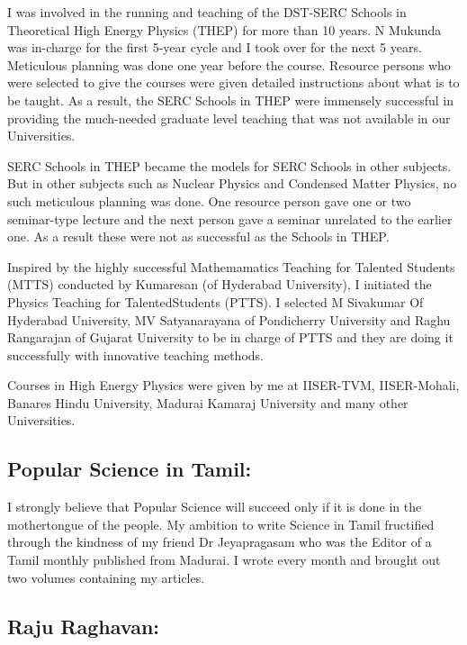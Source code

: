 I was involved in the running and teaching of the DST-SERC
Schools in Theoretical High Energy Physics (THEP) for more
than 10 years. N Mukunda was in-charge for the first 5-year
cycle and I took over for the next 5 years. Meticulous planning
was done one year before the course. Resource persons who were
selected to give the courses were given detailed instructions
about what is to be taught. As a result, the SERC Schools in
THEP were immensely successful in providing the much-needed
graduate level teaching that was not available in our Universities.


SERC Schools in THEP became the models for SERC Schools in other
subjects. But in other subjects such as Nuclear Physics and
Condensed Matter Physics, no such meticulous planning was done.
One resource person gave one or two seminar-type lecture and the
next person gave a seminar unrelated to the earlier one. As a result
these were not as successful as the Schools in THEP.


Inspired by the highly successful Mathemamatics Teaching for Talented 
Students (MTTS) conducted by Kumaresan (of Hydera\-bad University), I 
initiated the Physics Teaching for Talented\break Students (PTTS). I selected 
M Sivakumar Of Hyderabad Univer\-sity, MV Satyanarayana of Pondicherry 
University and Raghu Rangarajan of Gujarat University to be in charge 
of PTTS and they are doing it successfully with innovative teaching 
methods.


Courses in High Energy Physics were given by me at IISER-TVM, 
IISER-Mohali, Banares Hindu University, Madurai Kamaraj University and 
many other Universities.
\newpage

\subsection*{Popular Science in Tamil:}

I strongly believe that Popular Science will succeed only if it is done 
in the mothertongue of the people. My ambition to write Science in Tamil 
fructified through the kindness of my friend Dr Jeyapragasam who was the 
Editor of a Tamil monthly published from Madurai. I wrote every month 
and brought out two volumes containing my articles.

\vspace{-\topsep}
\subsection*{Raju Raghavan:}

